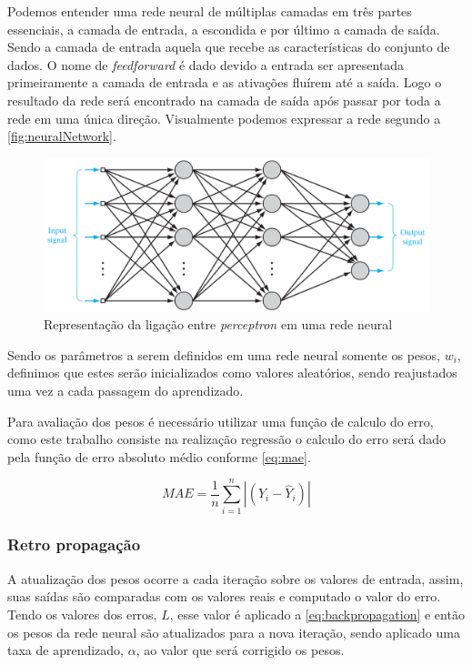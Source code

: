 \documentclass[
    12pt,
    oneside,
    a4paper,
    english,
    brazil
]{abntex2}
\begin{document}
Podemos  entender  uma  rede  neural   de  múltiplas  camadas  em  três  partes
essenciais, a camada  de entrada, a escondida  e por último a  camada de saída.
Sendo a camada  de entrada aquela que recebe as  características do conjunto de
dados. O nome  de \textit{feedforward} é dado devido a  entrada ser apresentada
primeiramente a camada  de entrada e as  ativações fluírem até a  saída. Logo o
resultado da  rede será encontrado  na camada de saída  após passar por  toda a
rede  em uma  única direção.  Visualmente podemos  expressar a  rede segundo  a
\autoref{fig:neuralNetwork}.

\begin{figure}[ht]
    \centering
    \caption{Representação da ligação entre \textit{perceptron} em uma rede
    neural}\label{fig:neuralNetwork}
    \includegraphics[width=.5\linewidth]{images/neuralNetwork.png}
\end{figure}

Sendo os  parâmetros a  serem definidos  em uma rede  neural somente  os pesos,
$w_i$, definimos que  estes serão inicializados como  valores aleatórios, sendo
reajustados uma vez a cada passagem do aprendizado.

Para avaliação dos  pesos é necessário utilizar uma função  de calculo do erro,
como este trabalho consiste na realização regressão o calculo do erro será dado
pela função de erro absoluto médio conforme \autoref{eq:mae}.

\begin{equation}\label{eq:mae}
    MAE = \frac{1}{n}\sum_{i=1}^{n}{|(Y_i - \hat{Y}_i)|}
\end{equation}

\subsubsection{Retro propagação}

A atualização  dos pesos ocorre  a cada iteração  sobre os valores  de entrada,
assim,  suas  saídas  são  comparadas  com  os  valores  reais  e  computado  o
valor  do erro.  Tendo os  valores  dos erros,  $L$,  esse valor  é aplicado  a
\autoref{eq:backpropagation} e  então os pesos  da rede neural  são atualizados
para a  nova iteração,  sendo aplicado  uma taxa  de aprendizado,  $\alpha$, ao
valor que será corrigido os pesos.
\end{document}

